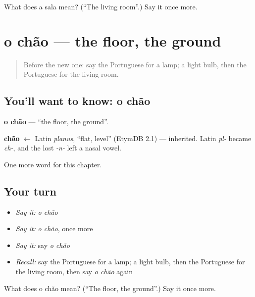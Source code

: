 \begin{tcolorbox}[breakable,colback=teal!4,colframe=teal!35!black,title={Before you move on}]
What does a sala mean? (\textquotedblleft{}The living room\textquotedblright{}.) Say it once more.
\end{tcolorbox}
\section[o chão]{o chão — the floor, the ground}

\label{lesson:PT-C50-chao}



\begin{quote}
Before the new one: say the Portuguese for a lamp; a light bulb, then the Portuguese for the living room.
\end{quote}

\subsection*{You'll want to know: o chão}
\textbf{o chão} — \textquotedblleft{}the floor, the ground\textquotedblright{}.

\begin{cousinweb}
\textbf{chão} $\leftarrow$ Latin \emph{planus}, \textquotedblleft{}flat, level\textquotedblright{} (EtymDB 2.1) — inherited. Latin \emph{pl-} became \emph{ch-}, and the lost \emph{-n-} left a nasal vowel.
\end{cousinweb}

\begin{grammarlens}[title={What you've built}]
One more word for this chapter.
\end{grammarlens}

\subsection*{Your turn}
\begin{itemize}
\raggedright
  \item \emph{Say it:} \emph{o chão}
  \item \emph{Say it:} \emph{o chão}, once more
  \item \emph{Say it:} say \emph{o chão}
  \item \emph{Recall:} say the Portuguese for a lamp; a light bulb, then the Portuguese for the living room, then say \emph{o chão} again
\end{itemize}

\begin{tcolorbox}[breakable,colback=teal!4,colframe=teal!35!black,title={Before you move on}]
What does o chão mean? (\textquotedblleft{}The floor, the ground\textquotedblright{}.) Say it once more.
\end{tcolorbox}
